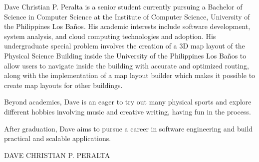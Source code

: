 
Dave Christian P. Peralta is a senior student currently pursuing a Bachelor of
Science in Computer Science at the Institute of Computer Science, University of
the Philippines Los Baños. His academic interests include software development,
system analysis, and cloud computing technologies and adoption. His
undergraduate special problem involves the creation of a 3D map layout of the
Physical Science Building inside the University of the Philippines Los Baños to
allow users to navigate inside the building with accurate and optimized routing,
along with the implementation of a map layout builder which makes it possible to
create map layouts for other buildings.

Beyond academics, Dave is an eager to try out many physical sports and explore
different hobbies involving music and creative writing, having fun in the
process.

After graduation, Dave aims to pursue a career in software engineering and build
practical and scalable applications.

\vspace{0.5in}
\begin{flushright}
DAVE CHRISTIAN P. PERALTA
\end{flushright}
